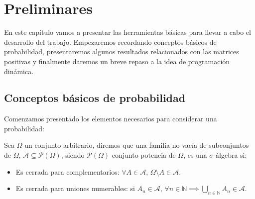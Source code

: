 \chapter{Preliminares}

En este capítulo vamos a presentar las herramientas básicas para llevar a cabo el desarrollo del trabajo. Empezaremos recordando conceptos básicos de probabilidad, presentaremos algunos resultados relacionados con las matrices positivas y finalmente daremos un breve repaso a la idea de programación dinámica.

\section{Conceptos básicos de probabilidad}
Comenzamos presentado los elementos necesarios para considerar una probabilidad:
\begin{definition}
    Sea $\Omega$ un conjunto arbitrario, diremos que una familia no vacía de subconjuntos de $\Omega$, $\mathcal{A}\subseteq\mathcal{P}(\Omega)$, siendo $\mathcal{P}(\Omega)$ conjunto potencia de $\Omega$, es una $\sigma$-álgebra si:
    \begin{itemize}
        \item Es cerrada para complementarios: $\forall A\in\mathcal{A},\, \Omega\setminus A\in\mathcal{A}.$
        \item Es cerrada para uniones numerables: si $A_{n}\in\mathcal{A}, \,\forall n\in\mathbb{N}  \implies \displaystyle\bigcup_{n\in\mathbb{N}}A_n\in\mathcal{A}.$
    \end{itemize}
\end{definition}

